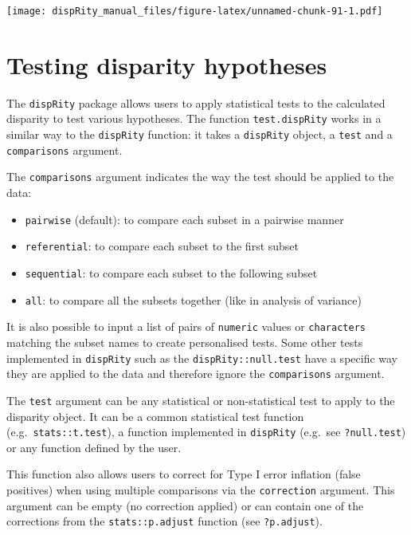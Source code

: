 \documentclass[
]{book}
\providecommand{\tightlist}{%
  \setlength{\itemsep}{0pt}\setlength{\parskip}{0pt}}
\begin{document}
\texttt{[image: dispRity\_manual\_files/figure-latex/unnamed-chunk-91-1.pdf]}

\hypertarget{testing-disparity-hypotheses}{%
\section{Testing disparity hypotheses}\label{testing-disparity-hypotheses}}

The \texttt{dispRity} package allows users to apply statistical tests to the calculated disparity to test various hypotheses.
The function \texttt{test.dispRity} works in a similar way to the \texttt{dispRity} function: it takes a \texttt{dispRity} object, a \texttt{test} and a \texttt{comparisons} argument.

The \texttt{comparisons} argument indicates the way the test should be applied to the data:

\begin{itemize}
\tightlist
\item
  \texttt{pairwise} (default): to compare each subset in a pairwise manner
\item
  \texttt{referential}: to compare each subset to the first subset
\item
  \texttt{sequential}: to compare each subset to the following subset
\item
  \texttt{all}: to compare all the subsets together (like in analysis of variance)
\end{itemize}

It is also possible to input a list of pairs of \texttt{numeric} values or \texttt{characters} matching the subset names to create personalised tests.
Some other tests implemented in \texttt{dispRity} such as the \texttt{dispRity::null.test} have a specific way they are applied to the data and therefore ignore the \texttt{comparisons} argument.

The \texttt{test} argument can be any statistical or non-statistical test to apply to the disparity object.
It can be a common statistical test function (e.g.~\texttt{stats::t.test}), a function implemented in \texttt{dispRity} (e.g.~see \texttt{?null.test}) or any function defined by the user.

This function also allows users to correct for Type I error inflation (false positives) when using multiple comparisons via the \texttt{correction} argument.
This argument can be empty (no correction applied) or can contain one of the corrections from the \texttt{stats::p.adjust} function (see \texttt{?p.adjust}).
\end{document}
